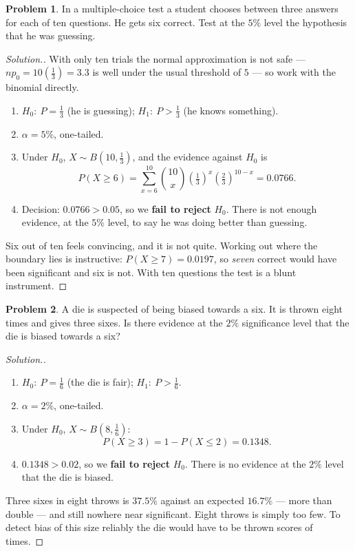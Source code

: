 \documentclass[11pt,a4paper]{article}
\theoremstyle{definition}
\newtheorem{problemx}{Problem}[section]
\newenvironment{problem}{\begin{problemx}}{\end{problemx}}
\newenvironment{solution}
  {\renewcommand{\qedsymbol}{}\begin{proof}[\textit{Solution}.]}
  {\end{proof}}
\begin{document}
\begin{problem}
In a multiple-choice test a student chooses between three answers for each of ten questions.
He gets six correct. Test at the $5\%$ level the hypothesis that he was guessing.
\end{problem}

\begin{solution}
With only ten trials the normal approximation is not safe --- $np_0=10\left(\tfrac{1}{3}\right)=3.3$
is well under the usual threshold of $5$ --- so work with the binomial directly.
\begin{enumerate}
\item $H_0:\ P=\tfrac{1}{3}$ (he is guessing); $H_1:\ P>\tfrac{1}{3}$ (he knows something).
\item $\alpha=5\%$, one-tailed.
\item Under $H_0$, $X\sim B\!\left(10,\tfrac{1}{3}\right)$, and the evidence against $H_0$ is
\[P(X\geq 6)=\sum_{x=6}^{10}\binom{10}{x}\left(\tfrac{1}{3}\right)^x\left(\tfrac{2}{3}\right)^{10-x}=0.0766.\]
\item Decision: $0.0766>0.05$, so we \textbf{fail to reject} $H_0$. There is not enough
evidence, at the $5\%$ level, to say he was doing better than guessing.
\end{enumerate}

Six out of ten feels convincing, and it is not quite. Working out where the boundary lies is
instructive: $P(X\geq 7)=0.0197$, so \emph{seven} correct would have been significant and six
is not. With ten questions the test is a blunt instrument.
\end{solution}

\begin{problem}
A die is suspected of being biased towards a six. It is thrown eight times and gives three
sixes. Is there evidence at the $2\%$ significance level that the die is biased towards a
six?
\end{problem}

\begin{solution}
\begin{enumerate}
\item $H_0:\ P=\tfrac{1}{6}$ (the die is fair); $H_1:\ P>\tfrac{1}{6}$.
\item $\alpha=2\%$, one-tailed.
\item Under $H_0$, $X\sim B\!\left(8,\tfrac{1}{6}\right)$:
\[P(X\geq 3)=1-P(X\leq 2)=0.1348.\]
\item $0.1348>0.02$, so we \textbf{fail to reject} $H_0$. There is no evidence at the $2\%$
level that the die is biased.
\end{enumerate}

Three sixes in eight throws is $37.5\%$ against an expected $16.7\%$ --- more than double ---
and still nowhere near significant. Eight throws is simply too few. To detect bias of this
size reliably the die would have to be thrown scores of times.
\end{solution}
\end{document}
